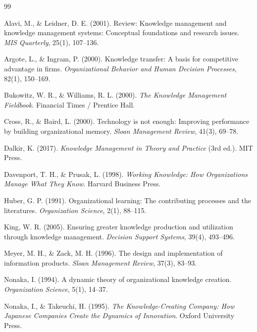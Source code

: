 \documentclass[12pt,a4paper]{report}
\begin{document}
\newpage

\begin{thebibliography}{99}


 Alavi, M., \& Leidner, D. E. (2001). Review: Knowledge management and knowledge management systems: Conceptual foundations and research issues. \textit{MIS Quarterly}, 25(1), 107--136.

 Argote, L., \& Ingram, P. (2000). Knowledge transfer: A basis for competitive advantage in firms. \textit{Organizational Behavior and Human Decision Processes}, 82(1), 150--169.

 Bukowitz, W. R., \& Williams, R. L. (2000). \textit{The Knowledge Management Fieldbook}. Financial Times / Prentice Hall.

 Cross, R., \& Baird, L. (2000). Technology is not enough: Improving performance by building organizational memory. \textit{Sloan Management Review}, 41(3), 69--78.

 Dalkir, K. (2017). \textit{Knowledge Management in Theory and Practice} (3rd ed.). MIT Press.

 Davenport, T. H., \& Prusak, L. (1998). \textit{Working Knowledge: How Organizations Manage What They Know}. Harvard Business Press.

 Huber, G. P. (1991). Organizational learning: The contributing processes and the literatures. \textit{Organization Science}, 2(1), 88--115.

 King, W. R. (2005). Ensuring greater knowledge production and utilization through knowledge management. \textit{Decision Support Systems}, 39(4), 493--496.

 Meyer, M. H., \& Zack, M. H. (1996). The design and implementation of information products. \textit{Sloan Management Review}, 37(3), 83--93.

 Nonaka, I. (1994). A dynamic theory of organizational knowledge creation. \textit{Organization Science}, 5(1), 14--37.

 Nonaka, I., \& Takeuchi, H. (1995). \textit{The Knowledge-Creating Company: How Japanese Companies Create the Dynamics of Innovation}. Oxford University Press.


\end{thebibliography}
\end{document}
